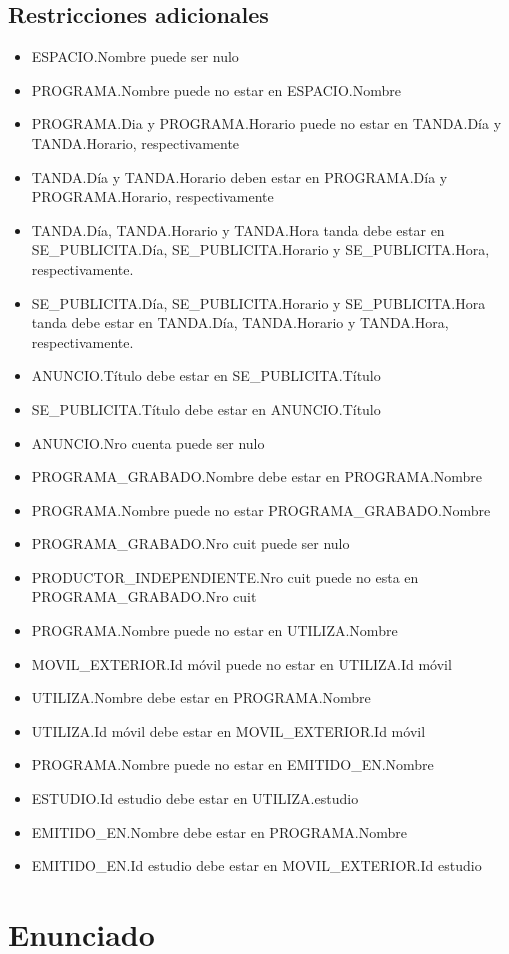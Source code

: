 \documentclass[a4paper,10pt]{article}
\begin{document}
  \subsection{Restricciones adicionales}
    \begin{itemize}
     \item ESPACIO.Nombre puede ser nulo
     \item PROGRAMA.Nombre puede no estar en ESPACIO.Nombre
     
     \item PROGRAMA.Dia y PROGRAMA.Horario puede no estar en TANDA.D\'ia y TANDA.Horario, respectivamente
     \item TANDA.D\'ia y TANDA.Horario deben estar en PROGRAMA.D\'ia y PROGRAMA.Horario, respectivamente
     
     \item TANDA.D\'ia, TANDA.Horario y TANDA.Hora tanda debe estar en \newline SE\_PUBLICITA.D\'ia, SE\_PUBLICITA.Horario 
      y SE\_PUBLICITA.Hora, respectivamente.
     \item SE\_PUBLICITA.D\'ia, SE\_PUBLICITA.Horario y SE\_PUBLICITA.Hora \newline tanda debe estar en TANDA.D\'ia, TANDA.Horario 
      y TANDA.Hora, respectivamente.
     \item ANUNCIO.T\'itulo debe estar en SE\_PUBLICITA.T\'itulo
     \item SE\_PUBLICITA.T\'itulo debe estar en ANUNCIO.T\'itulo
     
     \item ANUNCIO.Nro cuenta puede ser nulo

     \item PROGRAMA\_GRABADO.Nombre debe estar en PROGRAMA.Nombre
     \item PROGRAMA.Nombre puede no estar PROGRAMA\_GRABADO.Nombre

     \item PROGRAMA\_GRABADO.Nro cuit puede ser nulo
     \item PRODUCTOR\_INDEPENDIENTE.Nro cuit puede no esta en PROGRAMA\_GRABADO.Nro cuit

     \item PROGRAMA.Nombre puede no estar en UTILIZA.Nombre
     \item MOVIL\_EXTERIOR.Id m\'ovil puede no estar en UTILIZA.Id m\'ovil
     \item UTILIZA.Nombre debe estar en PROGRAMA.Nombre
     \item UTILIZA.Id m\'ovil debe estar en MOVIL\_EXTERIOR.Id m\'ovil

     \item PROGRAMA.Nombre puede no estar en EMITIDO\_EN.Nombre
     \item ESTUDIO.Id estudio debe estar en UTILIZA.estudio
     \item EMITIDO\_EN.Nombre debe estar en PROGRAMA.Nombre
     \item EMITIDO\_EN.Id estudio debe estar en MOVIL\_EXTERIOR.Id estudio
    \end{itemize}

\appendix
\newpage
\section{Enunciado}
  
\end{document}
